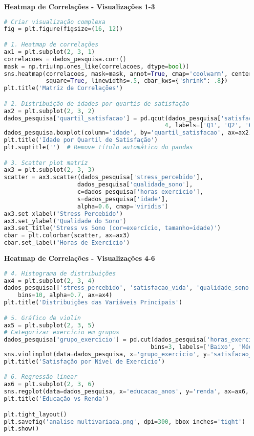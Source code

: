\begin{researchbox}
\textbf{Heatmap de Correlações - Visualizações 1-3}

\begin{lstlisting}[language=Python]
# Criar visualização complexa
fig = plt.figure(figsize=(16, 12))

# 1. Heatmap de correlações
ax1 = plt.subplot(2, 3, 1)
correlacoes = dados_pesquisa.corr()
mask = np.triu(np.ones_like(correlacoes, dtype=bool))
sns.heatmap(correlacoes, mask=mask, annot=True, cmap='coolwarm', center=0,
            square=True, linewidths=.5, cbar_kws={"shrink": .8})
plt.title('Matriz de Correlações')

# 2. Distribuição de idades por quartis de satisfação
ax2 = plt.subplot(2, 3, 2)
dados_pesquisa['quartil_satisfacao'] = pd.qcut(dados_pesquisa['satisfacao_vida'], 
                                              4, labels=['Q1', 'Q2', 'Q3', 'Q4'])
dados_pesquisa.boxplot(column='idade', by='quartil_satisfacao', ax=ax2)
plt.title('Idade por Quartil de Satisfação')
plt.suptitle('')  # Remove título automático do pandas

# 3. Scatter plot matriz
ax3 = plt.subplot(2, 3, 3)
scatter = ax3.scatter(dados_pesquisa['stress_percebido'], 
                     dados_pesquisa['qualidade_sono'],
                     c=dados_pesquisa['horas_exercicio'], 
                     s=dados_pesquisa['idade'],
                     alpha=0.6, cmap='viridis')
ax3.set_xlabel('Stress Percebido')
ax3.set_ylabel('Qualidade do Sono')
ax3.set_title('Stress vs Sono (cor=exercício, tamanho=idade)')
cbar = plt.colorbar(scatter, ax=ax3)
cbar.set_label('Horas de Exercício')
\end{lstlisting}
\end{researchbox}

\begin{researchbox}
\textbf{Heatmap de Correlações - Visualizações 4-6}

\begin{lstlisting}[language=Python]
# 4. Histograma de distribuições
ax4 = plt.subplot(2, 3, 4)
dados_pesquisa[['stress_percebido', 'satisfacao_vida', 'qualidade_sono']].hist(
    bins=10, alpha=0.7, ax=ax4)
plt.title('Distribuições das Variáveis Principais')

# 5. Gráfico de violin
ax5 = plt.subplot(2, 3, 5)
# Categorizar exercício em grupos
dados_pesquisa['grupo_exercicio'] = pd.cut(dados_pesquisa['horas_exercicio'],
                                          bins=3, labels=['Baixo', 'Médio', 'Alto'])
sns.violinplot(data=dados_pesquisa, x='grupo_exercicio', y='satisfacao_vida', ax=ax5)
plt.title('Satisfação por Nível de Exercício')

# 6. Regressão linear
ax6 = plt.subplot(2, 3, 6)
sns.regplot(data=dados_pesquisa, x='educacao_anos', y='renda', ax=ax6, scatter_kws={'alpha':0.6})
plt.title('Educação vs Renda')

plt.tight_layout()
plt.savefig('analise_multivariada.png', dpi=300, bbox_inches='tight')
plt.show()
\end{lstlisting}
\end{researchbox}

